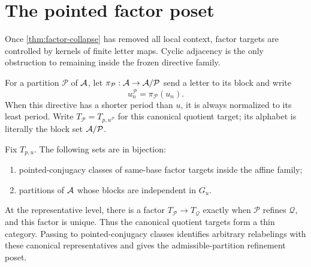 \section{The pointed factor poset}
\label{sec:poset}

Once \cref{thm:factor-collapse} has removed all local context, factor
targets are controlled by kernels of finite letter maps.  Cyclic adjacency
is the only obstruction to remaining inside the frozen directive family.

For a partition $\mathcal P$ of $\mathcal A$, let
$\pi_{\mathcal P}:\mathcal A\to\mathcal A/\mathcal P$ send a letter to its block and
write
\begin{equation}
  u^{\mathcal P}_n=\pi_{\mathcal P}(u_n).
  \label{eq:quotient-directive}
\end{equation}
When this directive has a shorter period than $u$, it is always normalized
to its least period.  Write
$T_{\mathcal P}=T_{p,u^{\mathcal P}}$ for this canonical quotient target;
its alphabet is literally the block set $\mathcal A/\mathcal P$.

\begin{theorem}
\label{thm:partition-poset}
  Fix $T_{p,u}$.  The following sets are in bijection:
  \begin{enumerate}[label=(\roman*),leftmargin=2.2em]
    \item pointed-conjugacy classes of same-base factor targets inside the
      affine family;
    \item partitions of $\mathcal A$ whose blocks are independent in $G_u$.
  \end{enumerate}
  At the representative level, there is a factor
  $T_{\mathcal P}\to T_{\mathcal Q}$ exactly when $\mathcal P$ refines
  $\mathcal Q$, and this factor is unique.  Thus the canonical quotient
  targets form a thin category.  Passing to pointed-conjugacy classes
  identifies arbitrary relabelings with these canonical representatives
  and gives the admissible-partition refinement poset.
\end{theorem}

